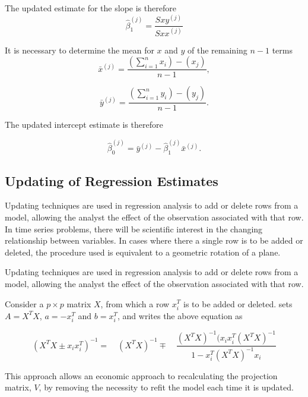 \documentclass[12pt, a4paper]{report}
\theoremstyle{plain}
\theoremstyle{definition}
\theoremstyle{remark}
\begin{document}
	The updated estimate for the slope is therefore
	\begin{equation}
	\hat{\beta}_{1}^{(j)}=\frac{Sxy^{(j)}}{Sxx^{(j)}}
	\end{equation}
	
	It is necessary to determine the mean for $x$ and $y$ of the remaining $n-1$ terms
	\begin{equation}
	\bar{x}^{(j)}=\frac{(\sum_{i=1}^{n}x_{i})-(x_{j})}{n-1},
	\end{equation}
	
	\begin{equation}
	\bar{y}^{(j)}=\frac{(\sum_{i=1}^{n}y_{i})-(y_{j})}{n-1}.
	\end{equation}
	
	The updated intercept estimate is therefore
	
	\begin{equation}
	\hat{\beta}_{0}^{(j)}=\bar{y}^{(j)}-\hat{\beta}_{1}^{(j)}\bar{x}^{(j)}.
	\end{equation}
	
	
	
	
	
	\subsection{Updating of Regression Estimates}
	Updating techniques are used in regression analysis to add or delete rows from a model, allowing the analyst the effect of the observation associated with that row. In time series problems, there will be scientific interest in the changing relationship between variables. In cases where there a single row is to be added or deleted, the procedure used is equivalent to a geometric rotation of a plane.
	
	Updating techniques are used in regression analysis to add or delete rows from a model, allowing the analyst the effect of the observation associated with that row.
	
	Consider a $p \times p$ matrix $X$, from which a row $x_{i}^{T}$ is to be added or deleted. \citet{CookWeisberg} sets $A = X^{T}X$,
	$a=-x_{i}^{T}$ and $b=x_{i}^{T}$, and writes the above equation as
	
	\begin{equation}
	(X^{T}X \pm x_{i}x_{i}^{T})^{-1} = \quad(X^{T}X )^{-1} \mp \quad
	\frac{(X^{T}X)^{-1}(x_{i}x_{i}^{T}(X^{T}X)^{-1}}{1-x_{i}^{T}(X^{T}X)^{-1}x_{i}}
	\end{equation}
	
	This approach allows an economic approach to recalculating the
	projection matrix, $V$, by removing the necessity to refit the
	model each time it is updated.
	
\end{document}
